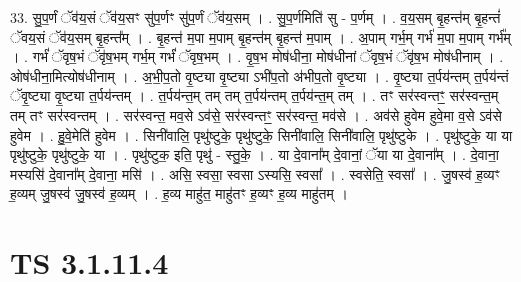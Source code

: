 \documentclass[17pt]{extarticle}
\begin{document}
33. सु॒प॒र्णं ॅव॑य॒सं ॅव॑य॒सꣳ सु॑प॒र्णꣳ सु॑प॒र्णं ॅव॑य॒सम् । . सु॒प॒र्णमिति॑ सु - प॒र्णम् । . व॒य॒सम् बृ॒हन्त॑म् बृ॒हन्तं॑ ॅवय॒सं ॅव॑य॒सम् बृ॒हन्त᳚म् । . बृ॒हन्त॑ म॒पा म॒पाम् बृ॒हन्त॑म् बृ॒हन्त॑ म॒पाम् । . अ॒पाम् गर्भ॒म् गर्भ॑ म॒पा म॒पाम् गर्भ᳚म् । . गर्भं॑ ॅवृष॒भं ॅवृ॑ष॒भम् गर्भ॒म् गर्भं॑ ॅवृष॒भम् । . वृ॒ष॒भ मोष॑धीना॒ मोष॑धीनां ॅवृष॒भं ॅवृ॑ष॒भ मोष॑धीनाम् । . ओष॑धीना॒मित्योष॑धीनाम् । . अ॒भी॒प॒तो वृ॒ष्ट्या वृ॒ष्ट्या ऽभी॑प॒तो अ॑भीप॒तो वृ॒ष्ट्या । . वृ॒ष्ट्या त॒र्पय॑न्तम् त॒र्पय॑न्तं ॅवृ॒ष्ट्या वृ॒ष्ट्या त॒र्पय॑न्तम् । . त॒र्पय॑न्त॒म् तम् तम् त॒र्पय॑न्तम् त॒र्पय॑न्त॒म् तम् । . तꣳ सर॑स्वन्तꣳ॒॒ सर॑स्वन्त॒म् तम् तꣳ सर॑स्वन्तम् । . सर॑स्वन्त॒ मव॒से ऽव॑से॒ सर॑स्वन्तꣳ॒॒ सर॑स्वन्त॒ मव॑से । . अव॑से हुवेम हुवे॒मा व॒से ऽव॑से हुवेम । . हु॒वे॒मेति॑ हुवेम । . सिनी॑वालि॒ पृथु॑ष्टुके॒ पृथु॑ष्टुके॒ सिनी॑वालि॒ सिनी॑वालि॒ पृथु॑ष्टुके । . पृथु॑ष्टुके॒ या या पृथु॑ष्टुके॒ पृथु॑ष्टुके॒ या । . पृथु॑ष्टुक॒ इति॒ पृथु॑ - स्तु॒के॒ । . या दे॒वाना᳚म् दे॒वानां॒ ॅया या दे॒वाना᳚म् । . दे॒वाना॒ मस्यसि॑ दे॒वाना᳚म् दे॒वाना॒ मसि॑ । . असि॒ स्वसा॒ स्वसा ऽस्यसि॒ स्वसा᳚ । . स्वसेति॒ स्वसा᳚ । . जु॒षस्व॑ ह॒व्यꣳ ह॒व्यम् जु॒षस्व॑ जु॒षस्व॑ ह॒व्यम् । . ह॒व्य माहु॑त॒ माहु॑तꣳ ह॒व्यꣳ ह॒व्य माहु॑तम् । \newline
\pagebreak
{}

\section{ TS 3.1.11.4 }
\end{document}
